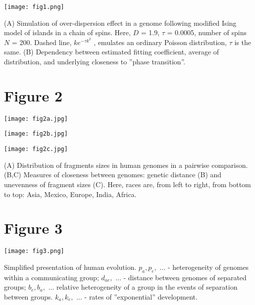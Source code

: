 \documentclass[a4paper]{article}
\begin{document}
\vskip 10pt

\texttt{[image: fig1.png]}

\vskip 15pt

(A) Simulation of over-dispersion effect in a genome following modified Ising model
of islands in a chain of spins. Here, $D$ = 1.9, $\tau$ = 0.0005, number of spins $N$ = 200. Dashed line,
$ke^{−\tau k^2}$ , emulates an ordinary Poisson distribution, $\tau$ is the same. (B) Dependency between
estimated fitting coefficient, average of distribution, and underlying closeness to ''phase transition''.

\newpage 

\section*{Figure 2}

\vskip 10pt

\texttt{[image: fig2a.jpg]}

\begin{minipage}[ht]{0.35\textwidth}
    \texttt{[image: fig2b.jpg]}
\end{minipage}
\hfill
\begin{minipage}[ht]{0.35\textwidth}
    \texttt{[image: fig2c.jpg]}
\end{minipage}

\vskip 15pt

(A) Distribution of fragments sizes in human genomes in a pairwise comparison. (B,C)
Measures of closeness between genomes: genetic distance (B) and unevenness of fragment sizes
(C). Here, races are, from left to right, from bottom to top: Asia, Mexico, Europe, India, Africa.

\newpage

\section*{Figure 3}

\vskip 10pt

\texttt{[image: fig3.png]}

\vskip 15pt

Simplified presentation of human evolution. $p_a, p_e,$ ... - heterogeneity of genomes within a communicating group; $d_{ae},$ ... - distance
between genomes of separated groups; $b_e, b_a,$ ... relative heterogeneity of a group in the events of separation between groups. $k_a, k_e,$ ... - rates of
''exponential'' development.
\end{document}
